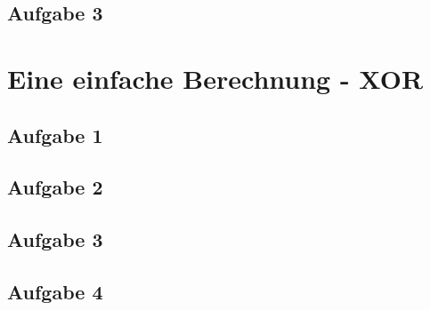 \documentclass[10pt,a4paper]{scrartcl}
\begin{document}
\subsection{Aufgabe 3}


\newpage


\section{Eine einfache Berechnung - XOR}


\subsection{Aufgabe 1}


\subsection{Aufgabe 2}


\subsection{Aufgabe 3}


\subsection{Aufgabe 4}
\end{document}
